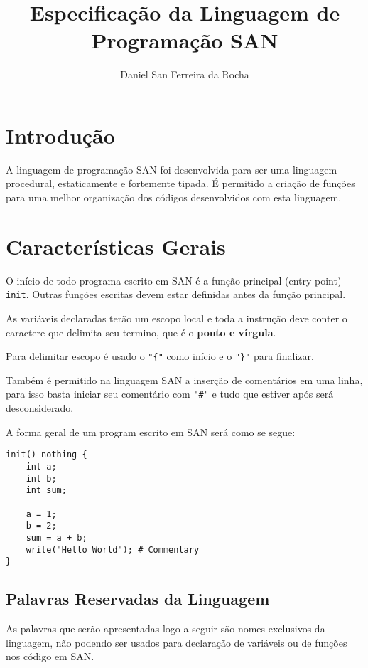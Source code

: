 \documentclass[a4paper,11pt]{article}
\title{Especificação da Linguagem de Programação SAN}
\author{Daniel San Ferreira da Rocha}
\begin{document}
\clearpage\maketitle
\thispagestyle{empty}

\pagebreak

\tableofcontents

\pagebreak

\section{Introdução}
A linguagem de programação SAN foi desenvolvida para ser uma linguagem procedural, estaticamente
e fortemente tipada. É permitido a criação de funções para uma melhor organização dos códigos
desenvolvidos com esta linguagem.

\section{Características Gerais}
O início de todo programa escrito em SAN é a função principal (entry-point) \texttt{init}.
Outras funções escritas devem estar definidas antes da função principal.

As variáveis declaradas terão um escopo local e toda a instrução deve conter o caractere que
delimita seu termino, que é o \textbf{ponto e vírgula}.

Para delimitar escopo é usado o \texttt{"\{"} como início e o \texttt{"\}"} para finalizar.

Também é permitido na linguagem SAN a inserção de comentários em uma linha, para isso basta
iniciar seu comentário com \texttt{"\#"} e tudo que estiver após será desconsiderado.

A forma geral de um program escrito em SAN será como se segue:
\begin{lstlisting}
init() nothing {
    int a;
    int b;
    int sum;

    a = 1;
    b = 2;
    sum = a + b;
    write("Hello World"); # Commentary
}
\end{lstlisting}

\subsection{Palavras Reservadas da Linguagem}
As palavras que serão apresentadas logo a seguir são nomes exclusivos da linguagem, não podendo
ser usados para declaração de variáveis ou de funções nos código em SAN.
\end{document}
